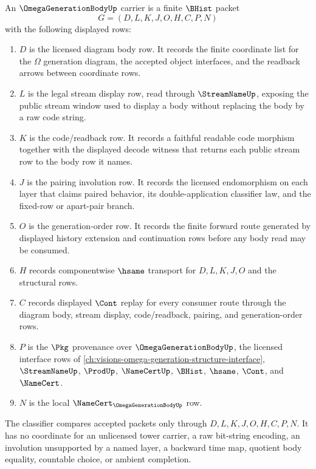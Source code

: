 \begin{definition}
\label{def:omega-generation-body-carrier}
An $\OmegaGenerationBodyUp$ carrier is a finite $\BHist$ packet
$$
G=(D,L,K,J,O,H,C,P,N)
$$
with the following displayed rows:
\begin{enumerate}
\item $D$ is the licensed diagram body row. It records the finite coordinate list for the $\Omega$ generation diagram, the accepted object interfaces, and the readback arrows between coordinate rows.
\item $L$ is the legal stream display row, read through $\StreamNameUp$, exposing the public stream window used to display a body without replacing the body by a raw code string.
\item $K$ is the code/readback row. It records a faithful readable code morphism together with the displayed decode witness that returns each public stream row to the body row it names.
\item $J$ is the pairing involution row. It records the licensed endomorphism on each layer that claims paired behavior, its double-application classifier law, and the fixed-row or apart-pair branch.
\item $O$ is the generation-order row. It records the finite forward route generated by displayed history extension and continuation rows before any body read may be consumed.
\item $H$ records componentwise $\hsame$ transport for $D,L,K,J,O$ and the structural rows.
\item $C$ records displayed $\Cont$ replay for every consumer route through the diagram body, stream display, code/readback, pairing, and generation-order rows.
\item $P$ is the $\Pkg$ provenance over $\OmegaGenerationBodyUp$, the licensed interface rows of \autoref{ch:visions-omega-generation-structure-interface}, $\StreamNameUp$, $\ProdUp$, $\NameCertUp$, $\BHist$, $\hsame$, $\Cont$, and $\NameCert$.
\item $N$ is the local $\NameCert_{\OmegaGenerationBodyUp}$ row.
\end{enumerate}
The classifier compares accepted packets only through $D,L,K,J,O,H,C,P,N$. It has no coordinate for an unlicensed tower carrier, a raw bit-string encoding, an involution unsupported by a named layer, a backward time map, quotient body equality, countable choice, or ambient completion.
\end{definition}

